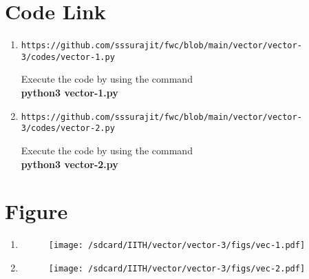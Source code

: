 \documentclass[journal,12pt,twocolumn]{IEEEtran}
\begin{document}
\section{\textbf{Code Link}}
\begin{enumerate}[label=(\roman*)]
\item 
\begin{lstlisting}
https://github.com/sssurajit/fwc/blob/main/vector/vector-3/codes/vector-1.py
\end{lstlisting}
Execute the code by using the command\\
\textbf{python3 vector-1.py}\\
\item
\begin{lstlisting}
https://github.com/sssurajit/fwc/blob/main/vector/vector-3/codes/vector-2.py
\end{lstlisting}
Execute the code by using the command\\
\textbf{python3 vector-2.py}\\
\end{enumerate}
\section{\textbf{Figure}}
\begin{enumerate}[label=(\roman*)]
\item
\begin{figure}[!ht]
    \centering
\texttt{[image: /sdcard/IITH/vector/vector-3/figs/vec-1.pdf]}
\caption{}
\label{fig:vec}
\end{figure}
\item
\begin{figure}[!ht]
    \centering
\texttt{[image: /sdcard/IITH/vector/vector-3/figs/vec-2.pdf]}
\caption{}
\label{fig:vec}
\end{figure}
\end{enumerate}
\end{document}
